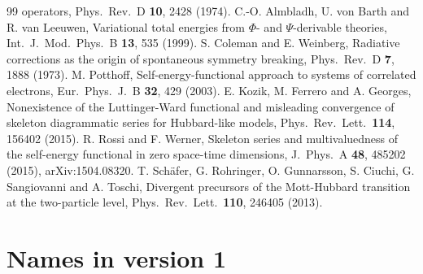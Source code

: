 \documentclass[11pt,a4paper]{article}
\begin{document}
\begin{thebibliography}{99}
  operators, Phys.\ Rev.\ D \textbf{10}, 2428 (1974).
 C.-O. Almbladh, U. von Barth and R. van Leeuwen, Variational total energies from
  $\Phi$- and $\Psi$-derivable theories, Int.\ J.\ Mod.\ Phys.\ B \textbf{13}, 535 (1999).
 S. Coleman and E. Weinberg, Radiative corrections as the origin of spontaneous symmetry
  breaking, Phys.\ Rev.\ D \textbf{7}, 1888 (1973).
 M. Potthoff, Self-energy-functional approach to systems of correlated electrons, Eur.\ Phys.\ J.\ B
  \textbf{32}, 429 (2003).
 E. Kozik, M. Ferrero and A. Georges, Nonexistence of the Luttinger-Ward functional and
  misleading convergence of skeleton diagrammatic series for Hubbard-like models, Phys.\ Rev.\ Lett.\ \textbf{114}, 156402
  (2015).
 R. Rossi and F. Werner, Skeleton series and multivaluedness of the self-energy functional in zero
  space-time dimensions, J.\ Phys.\ A \textbf{48}, 485202 (2015), arXiv:1504.08320.
 T. Sch\"afer, G. Rohringer, O. Gunnarsson, S. Ciuchi, G. Sangiovanni and A. Toschi, Divergent
  precursors of the Mott-Hubbard transition at the two-particle level, Phys.\ Rev.\ Lett.\ \textbf{110}, 246405 (2013).
\end{thebibliography}
\endgroup

\appendix
\section{Names in version 1}\label{sec:names}
\end{document}
